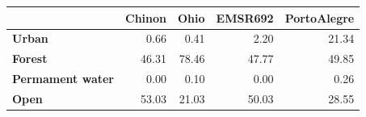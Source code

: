 \begin{tabular}{lrrrr}
\toprule
 & Chinon & Ohio & EMSR692 & PortoAlegre \\
\midrule
\textbf{Urban} & 0.66 & 0.41 & 2.20 & 21.34 \\
\textbf{Forest} & 46.31 & 78.46 & 47.77 & 49.85 \\
\textbf{Permament water} & 0.00 & 0.10 & 0.00 & 0.26 \\
\textbf{Open} & 53.03 & 21.03 & 50.03 & 28.55 \\
\bottomrule
\end{tabular}
